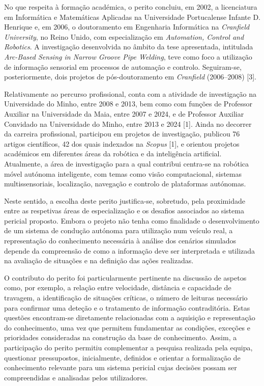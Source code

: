 No que respeita à formação académica, o perito concluiu, em 2002, a licenciatura em Informática e Matemáticas Aplicadas na Universidade Portucalense Infante D. Henrique e, em 2006, o doutoramento em Engenharia Informática na \emph{Cranfield University}, no Reino Unido, com especialização em \emph{Automation, Control and Robotics}. A investigação desenvolvida no âmbito da tese apresentada, intitulada \emph{Arc-Based Sensing in Narrow Groove Pipe Welding}, teve como foco a utilização de informação sensorial em processos de automação e controlo. Seguiram-se, posteriormente, dois projetos de pós-doutoramento em \emph{Cranfield} (2006--2008) [3].

Relativamente ao percurso profissional, conta com a atividade de investigação na Universidade do Minho, entre 2008 e 2013, bem como com funções de Professor Auxiliar na Universidade da Maia, entre 2007 e 2024, e de Professor Auxiliar Convidado na Universidade do Minho, entre 2013 e 2024 [1]. Ainda no decorrer da carreira profissional, participou em projetos de investigação, publicou 76 artigos científicos, 42 dos quais indexados na \emph{Scopus} [1], e orientou projetos académicos em diferentes áreas da robótica e da inteligência artificial. Atualmente, a área de investigação para a qual contribui centra-se na robótica móvel autónoma inteligente, com temas como visão computacional, sistemas multissensoriais, localização, navegação e controlo de plataformas autónomas.

Neste sentido, a escolha deste perito justifica-se, sobretudo, pela proximidade entre as
respetivas áreas de especialização e os desafios associados ao sistema pericial proposto. Embora o
projeto não tenha como finalidade o desenvolvimento de um sistema de condução autónoma para
utilização num veículo real, a representação do conhecimento necessária à análise dos cenários
simulados depende da compreensão de como a informação deve ser interpretada e utilizada na
avaliação de situações e na definição das ações realizadas.

O contributo do perito foi particularmente pertinente na discussão de aspetos como, por exemplo, a relação entre velocidade, distância e capacidade de travagem, a identificação de situações críticas, o número de leituras necessário para confirmar uma deteção e o tratamento de informação contraditória. Estas questões encontram-se diretamente relacionadas com a aquisição e representação do conhecimento, uma vez que permitem fundamentar as condições, exceções e prioridades consideradas na construção da base de conhecimento. Assim, a participação do perito permitiu complementar a pesquisa realizada pela equipa, questionar pressupostos, inicialmente, definidos e orientar a formalização de conhecimento relevante para um sistema pericial cujas decisões possam ser compreendidas e analisadas pelos utilizadores.

